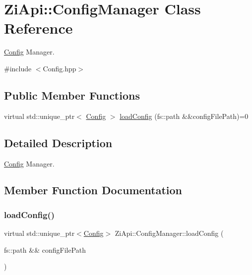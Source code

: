 \hypertarget{classZiApi_1_1ConfigManager}{}\section{Zi\+Api\+::Config\+Manager Class Reference}
\label{classZiApi_1_1ConfigManager}


\mbox{\hyperlink{classZiApi_1_1Config}{Config}} Manager.  




{\ttfamily \#include $<$Config.\+hpp$>$}

\subsection*{Public Member Functions}
\begin{DoxyCompactItemize}
\item 
virtual std\+::unique\+\_\+ptr$<$ \mbox{\hyperlink{classZiApi_1_1Config}{Config}} $>$ \mbox{\hyperlink{classZiApi_1_1ConfigManager_a2ff939835447181f4b7f4a6f5437fb31}{load\+Config}} (fs\+::path \&\&config\+File\+Path)=0
\end{DoxyCompactItemize}


\subsection{Detailed Description}
\mbox{\hyperlink{classZiApi_1_1Config}{Config}} Manager. 

\subsection{Member Function Documentation}
\mbox{\label{classZiApi_1_1ConfigManager_a2ff939835447181f4b7f4a6f5437fb31}} 
\subsubsection{\texorpdfstring{loadConfig()}{loadConfig()}}
{\footnotesize\ttfamily virtual std\+::unique\+\_\+ptr$<$\mbox{\hyperlink{classZiApi_1_1Config}{Config}}$>$ Zi\+Api\+::\+Config\+Manager\+::load\+Config (\begin{DoxyParamCaption}\item[{fs\+::path \&\&}]{config\+File\+Path }\end{DoxyParamCaption})\hspace{0.3cm}{\ttfamily [pure virtual]}}


